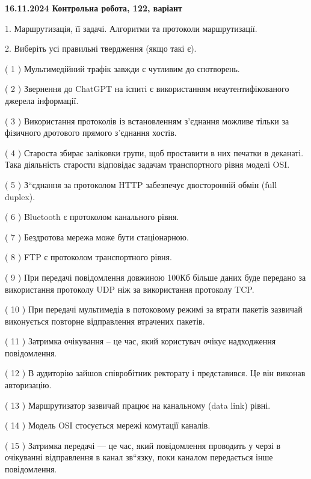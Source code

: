 \documentclass[12pt, ukrainian]{article}
\begin{document}
\vspace{4mm}
\newpage
\begin {large}

\textbf{16.11.2024 Контрольна робота, 122, варіант  }\par


{
1. Маршрутизація, її задачі. Алгоритми та протоколи маршрутизації.



\vspace{5mm}
2. Виберіть усі правильні твердження (якщо такі є).\par
\vspace{2mm}

( 1 ) Мультимедійний трафік завжди є чутливим до спотворень.

( 2 ) Звернення до ChatGPT на іспиті є використанням неаутентифікованого джерела інформації.

( 3 ) Використання протоколів із встановленням з'єднання можливе тільки за фізичного дротового прямого з'єднання хостів.

( 4 ) Староста збирає заліковки групи, щоб проставити в них печатки в деканаті. Така діяльність старости відповідає задачам транспортного рівня моделі OSI.

( 5 ) З“єднання за протоколом  HTTP забезпечує двосторонній обмін (full duplex).

( 6 ) Bluetooth є протоколом канального рівня.

( 7 ) Бездротова мережа може бути стаціонарною.

( 8 ) FTP є протоколом транспортного рівня.

( 9 ) При передачі повідомлення довжиною 100Кб більше даних буде передано за використання протоколу UDP ніж за використання протоколу TCP.

( 10 ) При передачі мультимедіа в потоковому режимі за втрати пакетів зазвичай виконується повторне відправлення втрачених пакетів.

( 11 ) Затримка очікування – це час, який користувач очікує надходження повідомлення.

( 12 ) В аудиторію зайшов співробітник ректорату і представився. Це він виконав авторизацію.

( 13 ) Маршрутизатор зазвичай працює на канальному (data link) рівні.

( 14 ) Модель OSI стосується мережі комутації каналів.

( 15 ) Затримка передачі — це час, який повідомлення проводить у черзі в очікуванні відправлення в канал зв“язку, поки каналом передається інше повідомлення.
}
\end {large}
\end{document}
